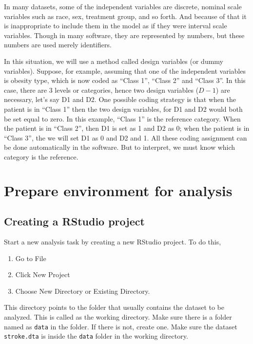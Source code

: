 \documentclass[
  10pt,
]{krantz}
\providecommand{\tightlist}{%
  \setlength{\itemsep}{0pt}\setlength{\parskip}{0pt}}
\begin{document}
In many datasets, some of the independent variables are discrete, nominal scale variables such as race, sex, treatment group, and so forth. And because of that it is inappropriate to include them in the model as if they were interval scale variables. Though in many software, they are represented by numbers, but these numbers are used merely identifiers.

In this situation, we will use a method called design variables (or dummy variables). Suppose, for example, assuming that one of the independent variables is obesity type, which is now coded as ``Class 1'', ``Class 2'' and ``Class 3''. In this case, there are 3 levels or categories, hence two design variables (\(D - 1\)) are necessary, let's say D1 and D2. One possible coding strategy is that when the patient is in ``Class 1'' then the two design variables, for D1 and D2 would both be set equal to zero. In this example, ``Class 1'' is the reference category. When the patient is in ``Class 2'', then D1 is set as 1 and D2 as 0; when the patient is in ``Class 3'', the we will set D1 as 0 and D2 and 1. All these coding assignment can be done automatically in the software. But to interpret, we must know which category is the reference.

\hypertarget{prepare-environment-for-analysis}{%
\section{Prepare environment for analysis}\label{prepare-environment-for-analysis}}

\hypertarget{creating-a-rstudio-project}{%
\subsection{Creating a RStudio project}\label{creating-a-rstudio-project}}

Start a new analysis task by creating a new RStudio project. To do this,

\begin{enumerate}
\def\labelenumi{\arabic{enumi}.}
\tightlist
\item
  Go to File
\item
  Click New Project
\item
  Choose New Directory or Existing Directory.
\end{enumerate}

This directory points to the folder that usually contains the dataset to be analyzed. This is called as the working directory. Make sure there is a folder named as \texttt{data} in the folder. If there is not, create one. Make sure the dataset \texttt{stroke.dta} is inside the \texttt{data} folder in the working directory.
\end{document}
